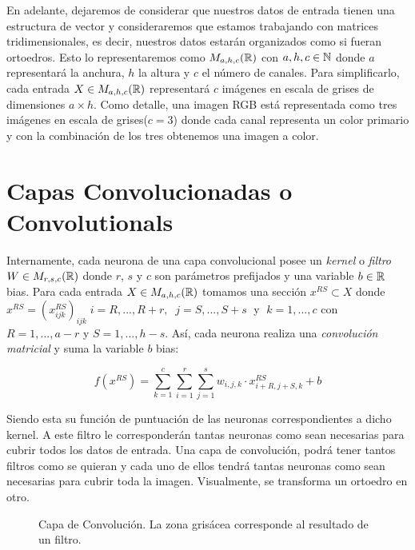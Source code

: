 En adelante, dejaremos de considerar que nuestros datos de entrada tienen una estructura de vector y consideraremos que estamos trabajando con matrices tridimensionales, es decir, nuestros datos estarán organizados como si fueran ortoedros. Esto lo representaremos como $M_{a,h,c}(\mathbb{R})$ con $a,h,c\in \mathbb{N}$ donde $a$ representará la anchura, $h$ la altura y $c$ el número de canales. Para simplificarlo, cada entrada $X\in M_{a,h,c}(\mathbb{R})$ representará $c$ imágenes en escala de grises de dimensiones $a\times h$. Como detalle, una imagen RGB está representada como tres imágenes en escala de grises($c=3$) donde cada canal representa un color primario y con la combinación de los tres obtenemos una imagen a color.

\section{Capas Convolucionadas o Convolutionals}

Internamente, cada neurona de una capa convolucional posee un \emph{kernel} o \emph{filtro} $W\in M_{r,s,c}(\mathbb{R})$ donde $r$, $s$ y $c$ son parámetros prefijados y una variable $b\in\mathbb{R}$ bias. Para cada entrada $X \in M_{a,h,c}(\mathbb{R})$ tomamos una sección $x^{RS} \subset X$ donde $x^{RS}=(x_{ijk}^{RS})_{ijk}\; i=R,...,R+r, \;\; j=S,...,S+s\;$ y $\;k=1,...,c$ con $R=1,...,a-r$ y $S=1,...,h-s$. Así, cada neurona realiza una \emph{convolución matricial} y suma la variable $b$ bias: \newline

$$f(x^{RS})=\sum_{k=1}^{c}\sum_{i=1}^{r} \sum_{j=1}^{s} w_{i,j,k} \cdot x_{i+R,j+S,k}^{RS}+b$$

Siendo esta su función de puntuación de las neuronas correspondientes a dicho kernel. A este filtro le corresponderán tantas neuronas como sean necesarias para cubrir todos los datos de entrada. Una capa de convolución, podrá tener tantos filtros como se quieran y cada uno de ellos tendrá tantas neuronas como sean necesarias para cubrir toda la imagen. Visualmente, se transforma un ortoedro en otro.\newline

\begin{figure}
\centering


\caption{Capa de Convolución. La zona grisácea corresponde al resultado de un filtro. }
\label{fig:convolution}
\end{figure}


